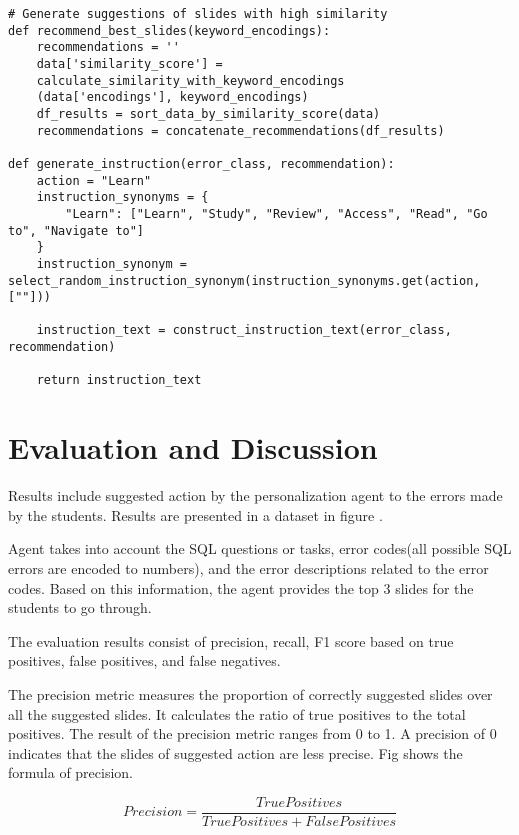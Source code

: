 \documentclass[conference]{IEEEtran}
\begin{document}
{{\begin{lstlisting}[caption={Pseudocode 1: Algorithm for Data Preprocessing, Action/Suggestion Generation}, captionpos=b, label = L_4_1]
# Generate suggestions of slides with high similarity
def recommend_best_slides(keyword_encodings):
    recommendations = ''
    data['similarity_score'] = 
    calculate_similarity_with_keyword_encodings
    (data['encodings'], keyword_encodings)
    df_results = sort_data_by_similarity_score(data)
    recommendations = concatenate_recommendations(df_results)

def generate_instruction(error_class, recommendation):
    action = "Learn"
    instruction_synonyms = {
        "Learn": ["Learn", "Study", "Review", "Access", "Read", "Go to", "Navigate to"]
    }
    instruction_synonym = select_random_instruction_synonym(instruction_synonyms.get(action, [""]))

    instruction_text = construct_instruction_text(error_class, recommendation)

    return instruction_text
\end{lstlisting}





\section{Evaluation and Discussion}
Results include suggested action by the personalization agent to the errors made by the students. Results are presented in a dataset in figure .

Agent takes into account the SQL questions or tasks, error codes(all possible SQL errors are encoded to numbers), and the error descriptions related to the error codes. Based on this information, the agent provides the top 3 slides for the students to go through.

The evaluation results consist of precision, recall, F1 score based on true positives, false positives, and false negatives.

The precision metric measures the proportion of correctly suggested slides over all the suggested slides. It calculates the ratio of true positives to the total positives\cite{dalianis2018evaluation}. The result of the precision metric ranges from 0 to 1. A precision of 0 indicates that the slides of suggested action are less precise. Fig shows the formula of precision.

\begin{equation}\label{Precision}
    Precision = \frac{True Positives}{True Positives + False Positives}
\end{equation}

}}
\end{document}
